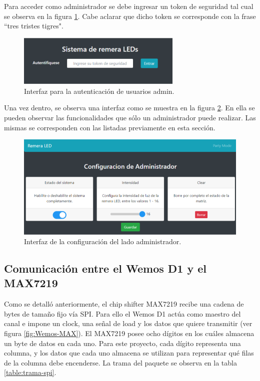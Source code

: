     Para acceder como administrador se debe ingresar un token de seguridad tal cual se observa en la figura \ref{fig:Web-auth}. Cabe aclarar que dicho token se corresponde con la frase ``tres tristes tigres".
    
    \begin{figure}[ht!]
    	\centering
    	\begin{center}
    		\includegraphics[width=0.7\textwidth]{imagenes/web/auth.png}
    		\caption{Interfaz para la autenticación de usuarios admin.}
    		\label{fig:Web-auth}
    	\end{center}
    \end{figure}
    
    Una vez dentro, se observa una interfaz como se muestra en la figura \ref{fig:Web-admin}. En ella se pueden observar las funcionalidades que sólo un administrador puede realizar. Las mismas se corresponden con las listadas previamente en esta sección.
    
    \begin{figure}[ht!]
    	\centering
    	\begin{center}
    		\includegraphics[width=\textwidth]{imagenes/web/admin-with-party.png}
    		\caption{Interfaz de la configuración del lado administrador.}
    		\label{fig:Web-admin}
    	\end{center}
    \end{figure}

    \subsection{Comunicación entre el Wemos D1 y el MAX7219}
    Como se detalló anteriormente, el chip shifter MAX7219 recibe una cadena de bytes de tamaño fijo vía SPI. Para ello el Wemos D1 actúa como maestro del canal e impone un clock, una señal de load y los datos que quiere transmitir (ver figura \ref{fig:Wemos-MAX}). El MAX7219 posee ocho dígitos en los cuáles almacena un byte de datos en cada uno. Para este proyecto, cada dígito representa una columna, y los datos que cada uno almacena se utilizan para representar qué filas de la columna debe encenderse. La trama del paquete se observa en la tabla \ref{table:trama-spi}.

